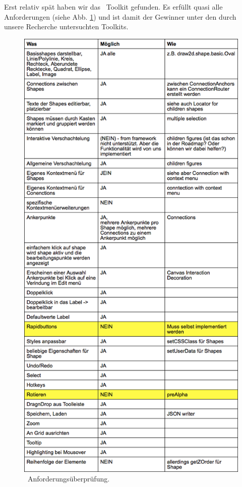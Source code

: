 \subsubsection{\dd}

Erst relativ spät haben wir das \dd~Toolkit gefunden.
Es erfüllt quasi alle Anforderungen (siehe Abb. \ref{fig.ddCheck})
und ist damit der Gewinner unter den
durch unsere Recherche untersuchten Toolkits.

\begin{figure}[h!]
  \includegraphics[height=0.9\textheight]{Figures/DD_Anforderungen.png}
  \caption{\dd~Anforderungsüberprüfung.}\label{fig.ddCheck}
\end{figure}

